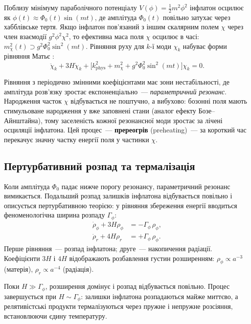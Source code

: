 \documentclass[12pt, a4paper]{article}
\begin{document}
Поблизу мінімуму параболічного потенціалу
$V(\phi) = \frac{1}{2}m^2\phi^2$ інфлатон осцилює як
$\phi(t) \approx \Phi_0(t)\sin(mt)$, де амплітуда
$\Phi_0(t)$ повільно затухає через хабблівське тертя.
Якщо інфлатон пов'язаний з іншим скалярним полем $\chi$
через член взаємодії $g^2\phi^2\chi^2$, то ефективна маса
поля $\chi$ осцилює в часі: $m_\chi^2(t) \supset
g^2\Phi_0^2\sin^2(mt)$. Рівняння руху для $k$-ї моди
$\chi_k$ набуває форми рівняння Матьє
\cite{kofman_1994, kofman_1997}:
\begin{equation}\label{eq:mathieu}
  \ddot{\chi}_k + 3H\dot{\chi}_k
  + \bigl[k_\mathrm{phys}^2 + m_\chi^2
         + g^2\Phi_0^2\sin^2(mt)\bigr]\chi_k = 0.
\end{equation}

Рівняння з періодично змінними коефіцієнтами має зони
нестабільності, де амплітуда розв'язку зростає
експоненціально~--- \emph{параметричний резонанс}.
Народження часток $\chi$ відбувається не поштучно, а
вибухово: бозонні поля мають стимульоване народження у
вже заповнені стани (аналог ефекту Бозе--Айнштайна), тому
заселеність кожної резонансної моди зростає за лічені
осциляції інфлатона. Цей процес~--- \textbf{пререогрів}
(preheating)~--- за короткий час перекачує значну частку
енергії поля у частинки $\chi$.

\subsection{Пертурбативний розпад та термалізація}

Коли амплітуда $\Phi_0$ падає нижче порогу резонансу,
параметричний резонанс вимикається. Подальший розпад
залишків інфлатона відбувається повільно і описується
пертурбативною теорією: у рівняння збереження енергії
вводиться феноменологічна ширина розпаду $\Gamma_\phi$:
\begin{align}
  \dot{\rho}_\phi + 3H\rho_\phi
    &= -\Gamma_\phi\,\rho_\phi,
    \label{eq:reheat_rho_phi} \\
  \dot{\rho}_r + 4H\rho_r
    &= +\Gamma_\phi\,\rho_\phi.
    \label{eq:reheat_rho_r}
\end{align}
Перше рівняння~--- розпад інфлатона; друге~--- накопичення
радіації. Коефіцієнти $3H$ і $4H$ відображають розбавлення
густин розширенням: $\rho_\phi \propto a^{-3}$ (матерія),
$\rho_r \propto a^{-4}$ (радіація).

Поки $H \gg \Gamma_\phi$, розширення домінує і розпад
відбувається повільно. Процес завершується при
$H \sim \Gamma_\phi$: залишки інфлатона розпадаються майже
миттєво, а релятивістські продукти термалізуються через
пружне і непружне розсіяння, встановлюючи єдину температуру.
\end{document}
